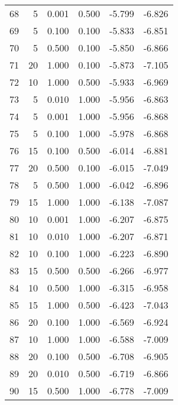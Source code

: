 \begin{tabular}{rrrrrr}
    68 &         5 &  0.001 & 0.500 &                 -5.799 &      -6.826 \\
    69 &         5 &  0.100 & 0.100 &                 -5.833 &      -6.851 \\
    70 &         5 &  0.500 & 0.100 &                 -5.850 &      -6.866 \\
    71 &        20 &  1.000 & 0.100 &                 -5.873 &      -7.105 \\
    72 &        10 &  1.000 & 0.500 &                 -5.933 &      -6.969 \\
    73 &         5 &  0.010 & 1.000 &                 -5.956 &      -6.863 \\
    74 &         5 &  0.001 & 1.000 &                 -5.956 &      -6.868 \\
    75 &         5 &  0.100 & 1.000 &                 -5.978 &      -6.868 \\
    76 &        15 &  0.100 & 0.500 &                 -6.014 &      -6.881 \\
    77 &        20 &  0.500 & 0.100 &                 -6.015 &      -7.049 \\
    78 &         5 &  0.500 & 1.000 &                 -6.042 &      -6.896 \\
    79 &        15 &  1.000 & 1.000 &                 -6.138 &      -7.087 \\
    80 &        10 &  0.001 & 1.000 &                 -6.207 &      -6.875 \\
    81 &        10 &  0.010 & 1.000 &                 -6.207 &      -6.871 \\
    82 &        10 &  0.100 & 1.000 &                 -6.223 &      -6.890 \\
    83 &        15 &  0.500 & 0.500 &                 -6.266 &      -6.977 \\
    84 &        10 &  0.500 & 1.000 &                 -6.315 &      -6.958 \\
    85 &        15 &  1.000 & 0.500 &                 -6.423 &      -7.043 \\
    86 &        20 &  0.100 & 1.000 &                 -6.569 &      -6.924 \\
    87 &        10 &  1.000 & 1.000 &                 -6.588 &      -7.009 \\
    88 &        20 &  0.100 & 0.500 &                 -6.708 &      -6.905 \\
    89 &        20 &  0.010 & 0.500 &                 -6.719 &      -6.866 \\
    90 &        15 &  0.500 & 1.000 &                 -6.778 &      -7.009 \\

\end{tabular}
